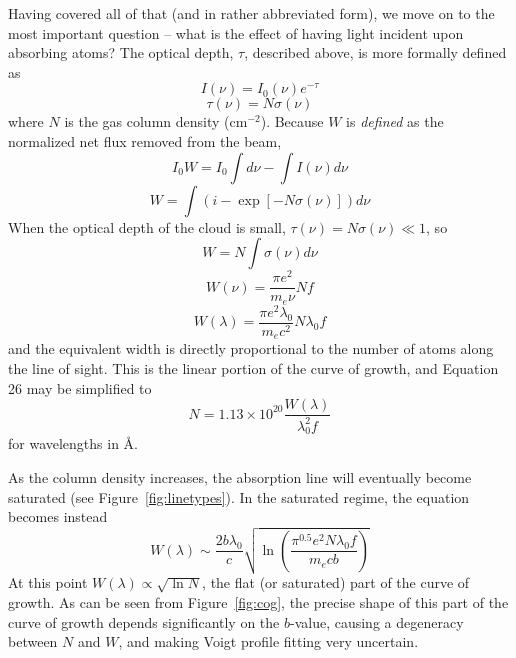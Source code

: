 Having covered all of that (and in rather abbreviated form), we move on to the most important question -- what is the effect of having light incident upon absorbing atoms? The optical depth, $\tau$, described above, is more formally defined as
\begin{equation}
	I(\nu) = I_0(\nu)e^{-\tau}
\end{equation}
\begin{equation}
	\tau(\nu) = N\sigma(\nu)
\end{equation}
where $N$ is the gas column density (cm$^{-2}$). Because $W$ is \emph{defined} as the normalized net flux removed from the beam,
\begin{equation}
	I_0 W = I_0 \int d\nu - \int I(\nu) d\nu
\end{equation}
\begin{equation}
	W = \int(i - \exp[-N \sigma(\nu)])d\nu
\end{equation}
When the optical depth of the cloud is small, $\tau(\nu) = N\sigma(\nu) \ll 1$, so
\begin{equation}
	W = N\int \sigma(\nu)d\nu
\end{equation}
\begin{equation}
	W(\nu) = \frac{\pi e^2}{m_e \nu}N f
\end{equation}
\begin{equation}
	W(\lambda) = \frac{\pi e^2 \lambda_0}{m_e c^2}N \lambda_0 f
\end{equation}
and the equivalent width is directly proportional to the number of atoms along the line of sight. This is the linear portion of the curve of growth, and Equation 26 may be simplified to
\begin{equation}
	N = 1.13 \times 10^{20} \frac{W(\lambda)}{\lambda_0^2 f}
\end{equation}
for wavelengths in \AA.

As the column density increases, the absorption line will eventually become saturated (see Figure~\ref{fig:linetypes}). In the saturated regime, the equation becomes instead
\begin{equation}
	W(\lambda) \sim \frac{2b\lambda_0}{c}\sqrt{\ln\left(\frac{\pi^{0.5}e^2N\lambda_0f}{m_ecb}\right)}
\end{equation}
At this point $W(\lambda) \propto \sqrt{\ln N}$, the flat (or saturated) part of the curve of growth. As can be seen from Figure~\ref{fig:cog}, the precise shape of this part of the curve of growth depends significantly on the $b$-value, causing a degeneracy between $N$ and $W$, and making Voigt profile fitting very uncertain.

